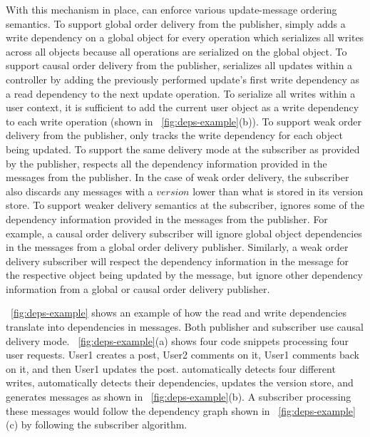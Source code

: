 With this mechanism in place, \synapse can enforce various
update-message ordering semantics.  To support global order delivery
from the publisher, \synapse simply adds a write dependency on a
global object for every operation which serializes all writes across
all objects because all operations are serialized on the global object.
To support causal order delivery from the publisher, \synapse
serializes all updates within a controller by adding the previously
performed update's first write dependency as a read dependency to the
next update operation.  To serialize all writes within a user context,
it is sufficient to add the current user object as a write dependency
to each write operation (shown in \F~\ref{fig:deps-example}(b)).
To support weak order delivery from the
publisher, \synapse only tracks the write dependency for each object
being updated.  To support the same delivery mode at the subscriber as
provided by the publisher, \synapse respects all the dependency
information provided in the messages from the publisher.  In the case
of weak order delivery, the subscriber also discards any messages
with a $version$ lower than what is stored in its version store.
To support weaker delivery semantics at the subscriber, \synapse
ignores some of the dependency information provided in the messages
from the publisher.  For example, a causal order delivery subscriber
will ignore global object dependencies in the messages from a
global order delivery publisher.  Similarly, a weak order delivery
subscriber will respect the dependency information in the message
for the respective object being updated by the message, but ignore
other dependency information from a global or causal order delivery
publisher.

\F~\ref{fig:deps-example} shows an example of how the read and write 
dependencies translate into dependencies in
messages. Both publisher and subscriber use causal delivery mode. \F~\ref{fig:deps-example}(a) shows four code snippets
processing four user requests.  User1 creates a post, User2
comments on it, User1 comments back on it, and then User1 updates the post.
\synapse automatically detects four different writes, automatically detects
their dependencies, updates the version store, and generates messages
as shown in \F~\ref{fig:deps-example}(b). A subscriber processing these messages
would follow the dependency graph shown in \F~\ref{fig:deps-example}(c) by
following the subscriber algorithm.



